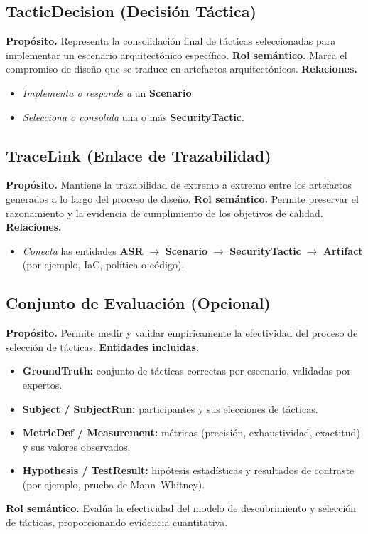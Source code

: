 \documentclass[12pt,letterpaper]{article}
\begin{document}
	\subsection{TacticDecision (Decisión Táctica)}
	\textbf{Propósito.} Representa la consolidación final de tácticas seleccionadas para implementar un escenario arquitectónico específico.  
	\textbf{Rol semántico.} Marca el compromiso de diseño que se traduce en artefactos arquitectónicos.  
	\textbf{Relaciones.}
	\begin{itemize}[noitemsep]
		\item \emph{Implementa o responde a} un \textbf{Scenario}.
		\item \emph{Selecciona o consolida} una o más \textbf{SecurityTactic}.
	\end{itemize}
	
	\subsection{TraceLink (Enlace de Trazabilidad)}
	\textbf{Propósito.} Mantiene la trazabilidad de extremo a extremo entre los artefactos generados a lo largo del proceso de diseño.  
	\textbf{Rol semántico.} Permite preservar el razonamiento y la evidencia de cumplimiento de los objetivos de calidad.  
	\textbf{Relaciones.}
	\begin{itemize}[noitemsep]
		\item \emph{Conecta} las entidades \textbf{ASR} $\rightarrow$ \textbf{Scenario} $\rightarrow$ \textbf{SecurityTactic} $\rightarrow$ \textbf{Artifact} (por ejemplo, IaC, política o código).
	\end{itemize}
	
	\subsection{Conjunto de Evaluación (Opcional)}
	\textbf{Propósito.} Permite medir y validar empíricamente la efectividad del proceso de selección de tácticas.  
	\textbf{Entidades incluidas.}
	\begin{itemize}[noitemsep]
		\item \textbf{GroundTruth:} conjunto de tácticas correctas por escenario, validadas por expertos.
		\item \textbf{Subject / SubjectRun:} participantes y sus elecciones de tácticas.
		\item \textbf{MetricDef / Measurement:} métricas (precisión, exhaustividad, exactitud) y sus valores observados.
		\item \textbf{Hypothesis / TestResult:} hipótesis estadísticas y resultados de contraste (por ejemplo, prueba de Mann--Whitney).
	\end{itemize}
	\textbf{Rol semántico.} Evalúa la efectividad del modelo de descubrimiento y selección de tácticas, proporcionando evidencia cuantitativa.
	
\end{document}
